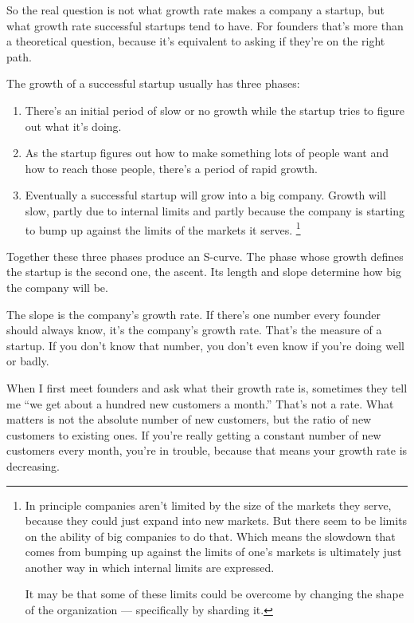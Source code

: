 \documentclass[12pt]{book}
\begin{document}
So the real question is not what growth rate makes a company a startup,
but what growth rate successful startups tend to have. For founders
that's more than a theoretical question, because it's equivalent to
asking if they're on the right path.

The growth of a successful startup usually has three phases:

\begin{enumerate}
\def\labelenumi{\arabic{enumi}.}
\item
  There's an initial period of slow or no growth while the startup tries
  to figure out what it's doing.
\item
  As the startup figures out how to make something lots of people want
  and how to reach those people, there's a period of rapid growth.
\item
  Eventually a successful startup will grow into a big company. Growth
  will slow, partly due to internal limits and partly because the
  company is starting to bump up against the limits of the markets it
  serves. \footnote{In principle companies aren't limited by the size of the markets
they serve, because they could just expand into new markets. But there
seem to be limits on the ability of big companies to do that. Which
means the slowdown that comes from bumping up against the limits of
one's markets is ultimately just another way in which internal limits
are expressed.

It may be that some of these limits could be overcome by changing the
shape of the organization --- specifically by sharding it.}
\end{enumerate}

Together these three phases produce an S-curve. The phase whose growth
defines the startup is the second one, the ascent. Its length and slope
determine how big the company will be.

The slope is the company's growth rate. If there's one number every
founder should always know, it's the company's growth rate. That's the
measure of a startup. If you don't know that number, you don't even know
if you're doing well or badly.

When I first meet founders and ask what their growth rate is, sometimes
they tell me ``we get about a hundred new customers a month.'' That's
not a rate. What matters is not the absolute number of new customers,
but the ratio of new customers to existing ones. If you're really
getting a constant number of new customers every month, you're in
trouble, because that means your growth rate is decreasing.
\end{document}
